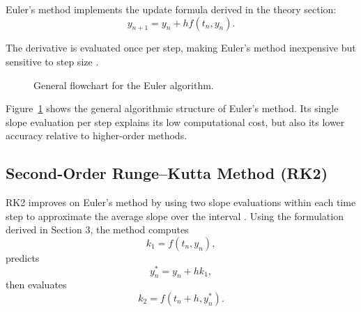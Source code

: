 \documentclass{article}
\begin{document}
Euler’s method implements the update formula derived in the theory section:
\[
y_{n+1} = y_n + h f(t_n, y_n).
\]

The derivative is evaluated once per step, making Euler’s method inexpensive but sensitive to step size \cite{3}.

\begin{figure}[H]
\centering
{}
\caption{General flowchart for the Euler algorithm.}
\label{fig:euler-general}
\end{figure}

Figure~\ref{fig:euler-general} shows the general algorithmic structure of Euler’s method. Its single slope evaluation per step explains its low computational cost, but also its lower accuracy relative to higher-order methods.

\subsection{Second-Order Runge--Kutta Method (RK2)}

RK2 improves on Euler’s method by using two slope evaluations within each time step to approximate the average slope over the interval \cite{2}. Using the formulation derived in Section 3, the method computes
\begin{equation}
k_1 = f(t_n, y_n),
\end{equation}
predicts
\begin{equation}
y_n^{*} = y_n + h k_1,
\end{equation}
then evaluates
\begin{equation}
k_2 = f(t_n + h, y_n^{*}).
\end{equation}
\end{document}
